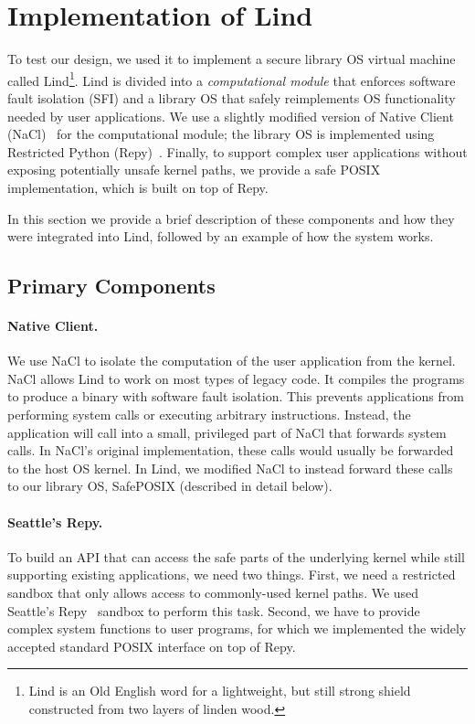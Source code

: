 \section{Implementation of Lind}
\label{sec.implementation}

To test our \lip design, we used it to implement a secure library OS virtual machine
called Lind\footnote{\scriptsize Lind is an Old English word for a lightweight, but still strong shield
constructed from two layers of linden wood.}.  Lind is divided into a
\emph{computational module} that enforces software fault isolation (SFI) and a
library OS that safely reimplements OS functionality needed by user
applications.  We use a slightly modified version of Native Client
(NaCl)~\cite{NaCl-09} for the computational module; the library OS is
implemented using Restricted Python (Repy)~\cite{Repy-10}. Finally, to support
complex user applications without exposing potentially unsafe kernel paths, we
provide a safe POSIX implementation, which is built on top of Repy.

In this section we provide a brief description of these components and how they
were integrated into Lind, followed by an example of how the system works.

\subsection{Primary Components}

\paragraph{Native Client.}
We use NaCl to isolate the computation of the user application
from the kernel. NaCl allows Lind to work on most types of legacy code.
It compiles the programs to produce a binary with software fault isolation.
This prevents applications from performing system calls
or executing arbitrary instructions.
Instead, the application will call into a small, privileged
part of NaCl that forwards system calls. In NaCl's original implementation,
these calls would usually be forwarded to the host OS kernel. In Lind, we
modified NaCl to instead forward these calls to our library OS, SafePOSIX
(described in detail below).

\paragraph{Seattle's Repy.}

To build an API that can access the safe parts of the underlying kernel while
still supporting existing applications, we need two things. First, we need a
restricted sandbox that only allows access to commonly-used kernel paths. We
used Seattle's Repy~\cite{Repy-10} sandbox to perform this task. Second, we
have to provide complex system functions to user programs,
for which we implemented the widely accepted standard POSIX interface on top of Repy.

